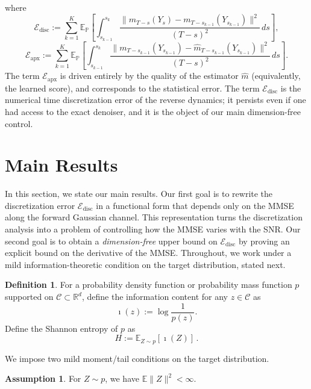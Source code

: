 \documentclass[11pt]{article}
\newcommand{\info}{\imath}         %
\theoremstyle{definition}
\newtheorem{definition}{Definition}
\newtheorem{assumption}{Assumption}
\newcommand{\R}{\mathbb{R}}
\newcommand{\E}{\mathbb{E}}
\numberwithin{equation}{section}
\begin{document}
where
\begingroup
\begin{equation}\label{eq:disc_err}
\mathcal{E}_{\mathrm{disc}}
:= \sum_{k=1}^K
\mathbb{E}_{\mathbb{P}}\left[
\int_{s_{k-1}}^{s_k}
\frac{\big\|m_{T-s}(Y_s)-m_{T-s_{k-1}}(Y_{s_{k-1}})\big\|^2}{(T-s)^2}\,ds
\right],
\end{equation}
\begin{equation*}
\mathcal{E}_{\mathrm{apx}}
:= \sum_{k=1}^K
\mathbb{E}_{\mathbb{P}}\left[
\int_{s_{k-1}}^{s_{k}}
\frac{\big\|m_{T-s_{k-1}}(Y_{s_{k-1}})-\hat m_{T-s_{k-1}}(Y_{s_
{k-1}})\big\|^2}{(T-s)^2}\,ds
\right].
\end{equation*}
\endgroup
The term $\mathcal{E}_{\mathrm{apx}}$ is driven entirely by the quality of the estimator $\hat m$ (equivalently, the learned score), and corresponds to the statistical error. The term $\mathcal{E}_{\mathrm{disc}}$ is the numerical time discretization error of the reverse dynamics; it persists even if one had access to the exact denoiser, and it is the object of our main dimension-free control.

\section{Main Results}
In this section, we state our main results. Our first goal is to rewrite the discretization error $\mathcal{E}_{\mathrm{disc}}$ in a functional form that depends only on the MMSE along the forward Gaussian channel. This representation turns the discretization analysis into a problem of controlling how the MMSE varies with the SNR. Our second goal is to obtain a \emph{dimension-free} upper bound on $\mathcal{E}_{\mathrm{disc}}$ by proving an explicit bound on the derivative of the MMSE. Throughout, we work under a mild information-theoretic condition on the target distribution, stated next.

\begin{definition}
For a probability density function or probability mass function $p$ supported on \(\mathcal C\subset\R^d\), define the information content for any $z\in \mathcal{C}$ as
\[
\info(z):=\log\frac{1}{p(z)}.
\]
Define the Shannon entropy of $p$ as
\[H:=\mathbb E_{Z\sim p}[\info(Z)]\,.\]
\end{definition}
We impose two mild moment/tail conditions on the target distribution.

\begin{assumption}\label{assumption0}
For $Z\sim p$, we have $\E\|Z\|^2<\infty$.
\end{assumption}
\end{document}
